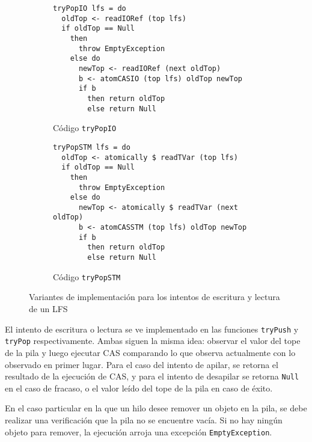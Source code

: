 \begin{figure}[t]
  \begin{subfigure}[b]{0.55\textwidth}
    \begin{verbatim}
tryPopIO lfs = do
  oldTop <- readIORef (top lfs)
  if oldTop == Null
    then
      throw EmptyException
    else do
      newTop <- readIORef (next oldTop)
      b <- atomCASIO (top lfs) oldTop newTop
      if b
        then return oldTop
        else return Null
    \end{verbatim}
    \caption{Código \texttt{tryPopIO}}
  \end{subfigure}
  \begin{subfigure}[b]{0.6\textwidth}
  \begin{verbatim}
tryPopSTM lfs = do
  oldTop <- atomically $ readTVar (top lfs)
  if oldTop == Null
    then
      throw EmptyException
    else do
      newTop <- atomically $ readTVar (next oldTop)
      b <- atomCASSTM (top lfs) oldTop newTop
      if b
        then return oldTop
        else return Null
  \end{verbatim}
  \caption{Código{} \texttt{tryPopSTM}}
  \end{subfigure}
  \caption{Variantes de implementación para los intentos de escritura y lectura de un LFS}
\end{figure}

El intento de escritura o lectura se ve implementado en las funciones \texttt{tryPush} y \texttt{tryPop} respectivamente. Ambas siguen la misma idea: observar el valor del tope de la pila y luego ejecutar CAS comparando lo que observa actualmente con lo observado en primer lugar. Para el caso del intento de apilar, se retorna el resultado de la ejecución de CAS, y para el intento de desapilar se retorna \texttt{Null} en el caso de fracaso, o el valor leído del tope de la pila en caso de éxito.

En el caso particular en la que un hilo desee remover un objeto en la pila, se debe realizar una verificación que la pila no se encuentre vacía. Si no hay ningún objeto para remover, la ejecución arroja una excepción \texttt{EmptyException}.

